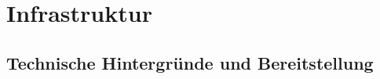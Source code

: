 \documentclass{subfiles}
\begin{document}
\chapter{Infrastruktur}\label{ch:server}

\section{Technische Hintergründe und Bereitstellung}\label{sec:infra-deployment}
\end{document}
